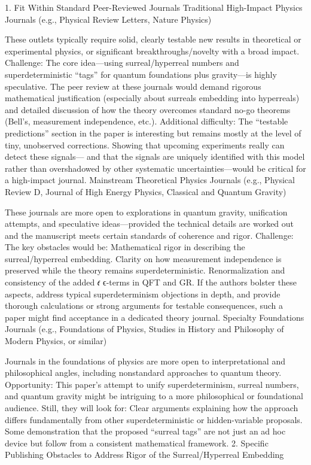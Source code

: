 1. Fit Within Standard Peer-Reviewed Journals
Traditional High-Impact Physics Journals (e.g., Physical Review Letters, Nature Physics)

These outlets typically require solid, clearly testable new results in theoretical or experimental physics, or significant breakthroughs/novelty with a broad impact.
Challenge: The core idea—using surreal/hyperreal numbers and superdeterministic “tags” for quantum foundations plus gravity—is highly speculative. The peer review at these journals would demand rigorous mathematical justification (especially about surreals embedding into hyperreals) and detailed discussion of how the theory overcomes standard no-go theorems (Bell’s, measurement independence, etc.).
Additional difficulty: The “testable predictions” section in the paper is interesting but remains mostly at the level of tiny, unobserved corrections. Showing that upcoming experiments really can detect these signals— and that the signals are uniquely identified with this model rather than overshadowed by other systematic uncertainties—would be critical for a high-impact journal.
Mainstream Theoretical Physics Journals (e.g., Physical Review D, Journal of High Energy Physics, Classical and Quantum Gravity)

These journals are more open to explorations in quantum gravity, unification attempts, and speculative ideas—provided the technical details are worked out and the manuscript meets certain standards of coherence and rigor.
Challenge: The key obstacles would be:
Mathematical rigor in describing the surreal/hyperreal embedding.
Clarity on how measurement independence is preserved while the theory remains superdeterministic.
Renormalization and consistency of the added 
𝜖
ϵ-terms in QFT and GR.
If the authors bolster these aspects, address typical superdeterminism objections in depth, and provide thorough calculations or strong arguments for testable consequences, such a paper might find acceptance in a dedicated theory journal.
Specialty Foundations Journals (e.g., Foundations of Physics, Studies in History and Philosophy of Modern Physics, or similar)

Journals in the foundations of physics are more open to interpretational and philosophical angles, including nonstandard approaches to quantum theory.
Opportunity: This paper’s attempt to unify superdeterminism, surreal numbers, and quantum gravity might be intriguing to a more philosophical or foundational audience.
Still, they will look for:
Clear arguments explaining how the approach differs fundamentally from other superdeterministic or hidden-variable proposals.
Some demonstration that the proposed “surreal tags” are not just an ad hoc device but follow from a consistent mathematical framework.
2. Specific Publishing Obstacles to Address
Rigor of the Surreal/Hyperreal Embedding

